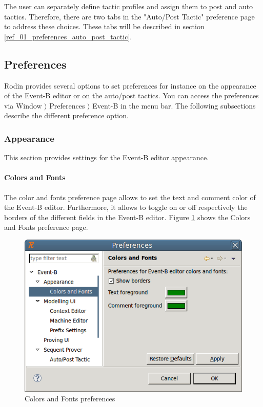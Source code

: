 The user can separately define tactic profiles and assign them to post and auto tactics. Therefore, there are two tabs in the "Auto/Post Tactic" preference page to address these choices. These tabs will be described in section \ref{ref_01_preferences_auto_post_tactic}. 

\subsection{Preferences}

Rodin provides several options to set preferences for instance on the appearance of the Event-B editor or on the auto/post tactics. You can access the preferences via \textsf{Window $\rangle$ Preferences $\rangle$ Event-B} in the menu bar. The following subsections describe the different preference option.

\subsubsection{Appearance}

This section provides settings for the Event-B editor appearance.

\paragraph{Colors and Fonts}

The color and fonts preference page allows to set the text and comment color of the Event-B editor. Furthermore, it allows to toggle on or off respectively the borders of the different fields in the Event-B editor. Figure \ref{fig_ref_01_preferences13} shows the Colors and Fonts preference page.

\begin{figure}[!h]
\begin{center}
	\includegraphics{img/reference/ref_01_preferences13.png}
	\caption{Colors and Fonts preferences}
	\label{fig_ref_01_preferences13}
\end{center}
\end{figure}

